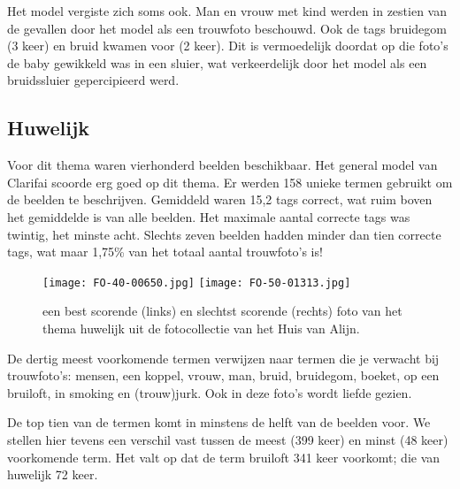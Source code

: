 Het model vergiste zich soms ook. Man en vrouw met kind werden in zestien van de gevallen door het model als een trouwfoto beschouwd. Ook de tags bruidegom (3 keer) en bruid kwamen voor (2 keer). Dit is vermoedelijk doordat op die foto’s de baby gewikkeld was in een sluier, wat verkeerdelijk door het model als een bruidssluier gepercipieerd werd.

\subsection{Huwelijk}

Voor dit thema waren vierhonderd beelden beschikbaar. Het general model van Clarifai scoorde erg goed op dit thema. Er werden 158 unieke termen gebruikt om de beelden te beschrijven. Gemiddeld waren 15,2 tags correct, wat ruim boven het gemiddelde is van alle beelden. Het maximale aantal correcte tags was twintig, het minste acht. Slechts zeven beelden hadden minder dan tien correcte tags, wat maar 1,75\% van het totaal aantal trouwfoto’s is!

\begin{figure}
	\centering
	\texttt{[image: FO-40-00650.jpg]}\hfill
	\texttt{[image: FO-50-01313.jpg]}\hfill
	\caption[Best en slechtst scorende foto van thema huwelijk]{een best scorende (links) en slechtst scorende (rechts) foto van het thema huwelijk uit de fotocollectie van het Huis van Alijn.}
\end{figure}

De dertig meest voorkomende termen verwijzen naar termen die je verwacht bij trouwfoto’s: mensen, een koppel, vrouw, man, bruid, bruidegom, boeket, op een bruiloft, in smoking en (trouw)jurk. Ook in deze foto’s wordt liefde gezien. 

De top tien van de termen komt in minstens de helft van de beelden voor. We stellen hier tevens een verschil vast tussen de meest (399 keer) en minst (48 keer) voorkomende term. Het valt op dat de term bruiloft 341 keer voorkomt; die van huwelijk 72 keer.


